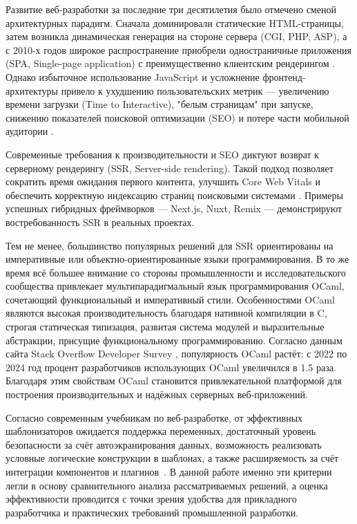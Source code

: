 Развитие веб-разработки за последние три десятилетия было отмечено сменой архитектурных парадигм.
Сначала доминировали статические HTML-страницы, затем возникла динамическая генерация на стороне сервера (CGI, PHP, ASP), а с 2010-х годов широкое распространение приобрели одностраничные приложения (SPA, Single-page application) с преимущественно клиентским рендерингом \cite{fowler2012patterns, kolce2018javascript}.
Однако избыточное использование JavaScript и усложнение фронтенд-архитектуры привело к ухудшению пользовательских метрик — увеличению времени загрузки (Time to Interactive), "белым страницам" при запуске, снижению показателей поисковой оптимизации (SEO) и потере части мобильной аудитории \cite{OsmaniJavaScript2019}.

Современные требования к производительности и SEO диктуют возврат к серверному рендерингу (SSR, Server-side rendering).
Такой подход позволяет сократить время ожидания первого контента, улучшить Core Web Vitals и обеспечить корректную индексацию страниц поисковыми системами \cite{HTTPArchive2022}.
Примеры успешных гибридных фреймворков — Next.js, Nuxt, Remix — демонстрируют востребованность SSR в реальных проектах.

Тем не менее, большинство популярных решений для SSR ориентированы на императивные или объектно-ориентированные языки программирования.
В то же время всё большее внимание со стороны промышленности и исследовательского сообщества привлекает мультипарадигмальный язык программирования OCaml, сочетающий функциональный и императивный стили.
Особенностями OCaml являются высокая производительность благодаря нативной компиляции в C, строгая статическая типизация, развитая система модулей и выразительные абстракции, присущие функциональному программированию.
Согласно данным сайта Stack Overflow Developer Survey \cite{StackOverflow2022}, популярность OCaml растёт: с 2022 по 2024 год процент разработчиков использующих OCaml увеличился в 1.5 раза.
Благодаря этим свойствам OCaml становится привлекательной платформой для построения производительных и надёжных серверных веб-приложений.

Согласно современным учебникам по веб-разработке, от эффективных шаблонизаторов ожидается поддержка переменных, достаточный уровень безопасности за счёт автоэкранирования данных, возможность реализовать условные логические конструкции в шаблонах, а также расширяемость за счёт интеграции компонентов и плагинов~\cite{Osipov2022}.
В данной работе именно эти критерии легли в основу сравнительного анализа рассматриваемых решений, а оценка эффективности проводится с точки зрения удобства для прикладного разработчика и практических требований промышленной разработки.

